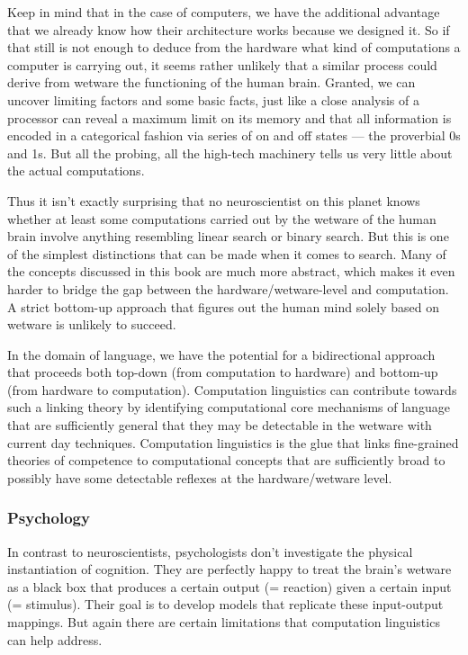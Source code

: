 Keep in mind that in the case of computers, we have the additional advantage that we already know how their architecture works because we designed it.
So if that still is not enough to deduce from the hardware what kind of computations a computer is carrying out, it seems rather unlikely that a similar process could derive from wetware the functioning of the human brain.
Granted, we can uncover limiting factors and some basic facts, just like a close analysis of a processor can reveal a maximum limit on its memory and that all information is encoded in a categorical fashion via series of on and off states --- the proverbial 0s and 1s.
But all the probing, all the high-tech machinery tells us very little about the actual computations.

Thus it isn't exactly surprising that no neuroscientist on this planet knows whether at least some computations carried out by the wetware of the human brain involve anything resembling linear search or binary search.
But this is one of the simplest distinctions that can be made when it comes to search.
Many of the concepts discussed in this book are much more abstract, which makes it even harder to bridge the gap between the hardware\slash wetware-level and computation.
A strict bottom-up approach that figures out the human mind solely based on wetware is unlikely to succeed.

In the domain of language, we have the potential for a bidirectional approach that proceeds both top-down (from computation to hardware) and bottom-up (from hardware to computation).
Computation linguistics can contribute towards such a linking theory by identifying computational core mechanisms of language that are sufficiently general that they may be detectable in the wetware with current day techniques.
Computation linguistics is the glue that links fine-grained theories of competence to computational concepts that are sufficiently broad to possibly have some detectable reflexes at the hardware\slash wetware level.


\subsubsection{Psychology}
\label{sub:formal_arguments_science_psych}

In contrast to neuroscientists, psychologists don't investigate the physical instantiation of cognition.
They are perfectly happy to treat the brain's wetware as a black box that produces a certain output (= reaction) given a certain input (= stimulus).
Their goal is to develop models that replicate these input-output mappings.
But again there are certain limitations that computation linguistics can help address.

